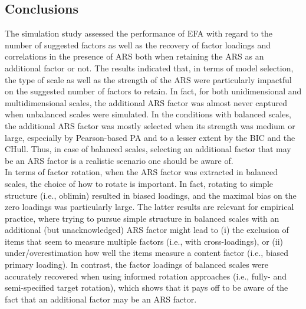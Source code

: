 \documentclass[a4paper,man,natbib]{apa6}
\begin{document}
\begin{linenumbers}
\subsection{Conclusions}

The simulation study assessed the performance of EFA with regard  to the number of suggested factors as well as the recovery of factor loadings and correlations in the presence of ARS both when retaining the ARS as an additional factor or not. The results indicated that, in terms of model selection, the type of scale as well as the strength of the ARS were particularly impactful on the suggested number of factors to retain. In fact, for both unidimensional and multidimensional scales, the additional ARS factor was almost never captured when unbalanced scales were simulated. %
In the conditions with balanced scales, the additional ARS factor was mostly selected when its strength was medium or large, especially by Pearson-based PA and to a lesser extent by the BIC and the CHull. Thus, in case of balanced scales, selecting an additional factor that may be an ARS factor is a realistic scenario one should be aware of.\\
In terms of factor rotation, when the ARS factor was extracted in balanced scales, the choice of how to rotate is important. In fact, rotating to simple structure (i.e., oblimin) resulted in biased loadings, and the maximal bias on the zero loadings was particularly large. The latter results are relevant for empirical practice, where trying to pursue simple structure in balanced scales with an additional (but unacknowledged) ARS factor might lead to (i) the exclusion of items that seem to measure multiple factors (i.e., with cross-loadings), or (ii) under/overestimation how well the items measure a content factor (i.e., biased primary loading). In contrast, the factor loadings of balanced scales were accurately recovered when using informed rotation approaches (i.e., fully- and semi-specified target rotation), which shows that it pays off to be aware of the fact that an additional factor may be an ARS factor. %

\end{linenumbers}
\end{document}
